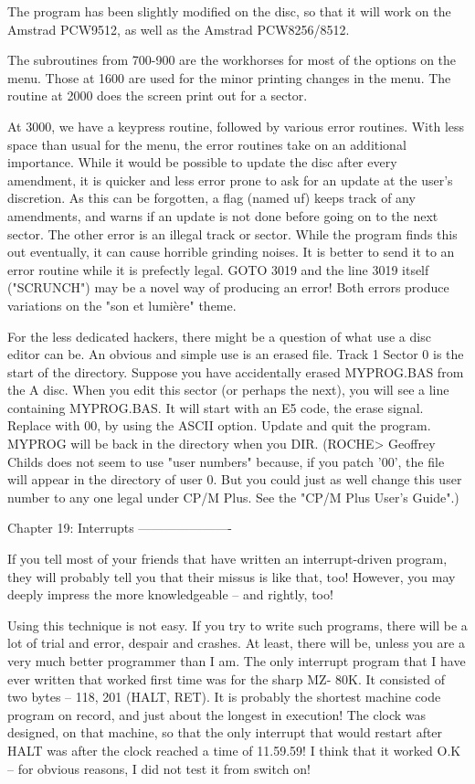 The  program has been slightly modified on the disc, so that it will  work  on 
the Amstrad PCW9512, as well as the Amstrad PCW8256/8512.

The subroutines from 700-900 are the workhorses for most of the options on the 
menu.  Those at 1600 are used for the minor printing changes in the menu.  The 
routine at 2000 does the screen print out for a sector.

At 3000, we have a keypress routine, followed by various error routines.  With 
less  space than usual for the menu, the error routines take on an  additional 
importance.  While  it  would  be possible to  update  the  disc  after  every 
amendment,  it  is quicker and less error prone to ask for an  update  at  the 
user's discretion. As this can be forgotten, a flag (named uf) keeps track  of 
any amendments, and warns if an update is not done before going on to the next 
sector. The other error is an illegal track or sector. While the program finds 
this  out eventually, it can cause horrible grinding noises. It is  better  to 
send  it  to an error routine while it is prefectly legal. GOTO 3019  and  the 
line  3019 itself ("SCRUNCH") may be a novel way of producing an  error!  Both 
errors produce variations on the "son et lumière" theme.

For  the less dedicated hackers, there might be a question of what use a  disc 
editor  can be. An obvious and simple use is an erased file. Track 1 Sector  0 
is the start of the directory. Suppose you have accidentally erased MYPROG.BAS 
from the A disc. When you edit this sector (or perhaps the next), you will see 
a line containing MYPROG.BAS. It will start with an E5 code, the erase signal. 
Replace  with  00,  by using the ASCII option. Update and  quit  the  program. 
MYPROG  will  be back in the directory when you DIR. (ROCHE>  Geoffrey  Childs 
does not seem to use "user numbers" because, if you patch '00', the file  will 
appear in the directory of user 0. But you could just as well change this user 
number to any one legal under CP/M Plus. See the "CP/M Plus User's Guide".)


Chapter 19: Interrupts
----------------------

If  you  tell  most  of your friends that  have  written  an  interrupt-driven 
program,  they  will probably tell you that their missus is  like  that,  too! 
However, you may deeply impress the more knowledgeable -- and rightly, too!

Using  this  technique is not easy. If you try to write such  programs,  there 
will  be a lot of trial and error, despair and crashes. At least,  there  will 
be, unless you are a very much better programmer than I am. The only interrupt 
program that I have ever written that worked first time was for the sharp  MZ-
80K.  It  consisted of two bytes -- 118, 201 (HALT, RET). It is  probably  the 
shortest  machine  code  program  on record, and just  about  the  longest  in 
execution! The clock was designed, on that machine, so that the only interrupt 
that would restart after HALT was after the clock reached a time of  11.59.59! 
I  think  that it worked O.K -- for obvious reasons, I did not  test  it  from 
switch on!

